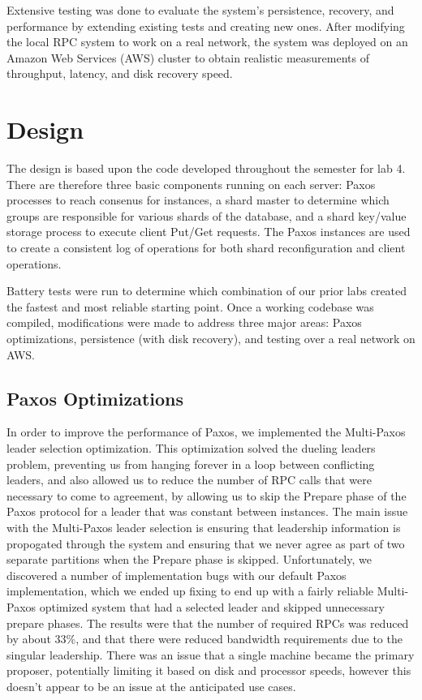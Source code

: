 \documentclass[letterpaper,10pt]{article}
\begin{document}
\begin{itemize}
Extensive testing was done to evaluate the system's persistence,
recovery, and performance by extending existing tests and creating new
ones.  After modifying the local RPC system to work on a real network,
the system was deployed on an Amazon Web Services (AWS) cluster to
obtain realistic measurements of throughput, latency, and disk
recovery speed.

\section{Design} \label{sec:design} The design is based upon the code
developed throughout the semester for lab 4.  There are therefore
three basic components running on each server: Paxos processes to
reach consenus for instances, a shard master to determine which groups
are responsible for various shards of the database, and a shard
key/value storage process to execute client Put/Get requests.  The
Paxos instances are used to create a consistent log of operations for
both shard reconfiguration and client operations.

Battery tests were run to determine which combination of our prior
labs created the fastest and most reliable starting point.  Once a
working codebase was compiled, modifications were made to address
three major areas: Paxos optimizations, persistence (with disk
recovery), and testing over a real network on AWS.

\subsection{Paxos Optimizations}
In order to improve the performance of Paxos, we implemented the
Multi-Paxos leader selection optimization. This optimization solved
the dueling leaders problem, preventing us from hanging forever in a
loop between conflicting leaders, and also allowed us to reduce the
number of RPC calls that were necessary to come to agreement, by
allowing us to skip the Prepare phase of the Paxos protocol for a
leader that was constant between instances. The main issue with the
Multi-Paxos leader selection is ensuring that leadership information
is propogated through the system and ensuring that we never agree as
part of two separate partitions when the Prepare phase is
skipped. Unfortunately, we discovered a number of implementation bugs
with our default Paxos implementation, which we ended up fixing to end
up with a fairly reliable Multi-Paxos optimized system that had a
selected leader and skipped unnecessary prepare phases. The results
were that the number of required RPCs was reduced by about 33\%, and
that there were reduced bandwidth requirements due to the singular
leadership. There was an issue that a single machine became the
primary proposer, potentially limiting it based on disk and processor
speeds, however this doesn't appear to be an issue at the anticipated
use cases.


\end{itemize}
\end{document}
